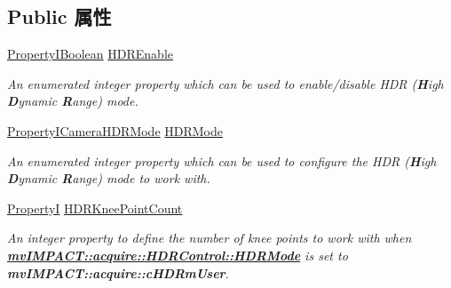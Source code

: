 \subsection*{Public 属性}
\begin{DoxyCompactItemize}
\item 
\hyperlink{group___common_interface_ga44f9437e24b21b6c93da9039ec6786aa}{Property\+I\+Boolean} \hyperlink{classmv_i_m_p_a_c_t_1_1acquire_1_1_h_d_r_control_ac1258a5d35abaeff1e586c262c237cf5}{H\+D\+R\+Enable}
\begin{DoxyCompactList}\small\item\em An enumerated integer property which can be used to enable/disable H\+D\+R ({\bfseries H}igh {\bfseries D}ynamic {\bfseries R}ange) mode. \end{DoxyCompactList}\item 
\hyperlink{group___device_specific_interface_ga9fcfc71faac692386a041097fd751d24}{Property\+I\+Camera\+H\+D\+R\+Mode} \hyperlink{classmv_i_m_p_a_c_t_1_1acquire_1_1_h_d_r_control_af3ea6905ac186b59126fd22a2bdf3fa3}{H\+D\+R\+Mode}
\begin{DoxyCompactList}\small\item\em An enumerated integer property which can be used to configure the H\+D\+R ({\bfseries H}igh {\bfseries D}ynamic {\bfseries R}ange) mode to work with. \end{DoxyCompactList}\item 
\hypertarget{classmv_i_m_p_a_c_t_1_1acquire_1_1_h_d_r_control_a010cba00a4f470594ce66b6742544709}{\hyperlink{group___common_interface_ga12d5e434238ca242a1ba4c6c3ea45780}{Property\+I} \hyperlink{classmv_i_m_p_a_c_t_1_1acquire_1_1_h_d_r_control_a010cba00a4f470594ce66b6742544709}{H\+D\+R\+Knee\+Point\+Count}}\label{classmv_i_m_p_a_c_t_1_1acquire_1_1_h_d_r_control_a010cba00a4f470594ce66b6742544709}

\begin{DoxyCompactList}\small\item\em An integer property to define the number of knee points to work with when {\bfseries \hyperlink{classmv_i_m_p_a_c_t_1_1acquire_1_1_h_d_r_control_af3ea6905ac186b59126fd22a2bdf3fa3}{mv\+I\+M\+P\+A\+C\+T\+::acquire\+::\+H\+D\+R\+Control\+::\+H\+D\+R\+Mode}} is set to {\bfseries mv\+I\+M\+P\+A\+C\+T\+::acquire\+::c\+H\+D\+Rm\+User}. \end{DoxyCompactList}\end{DoxyCompactItemize}
